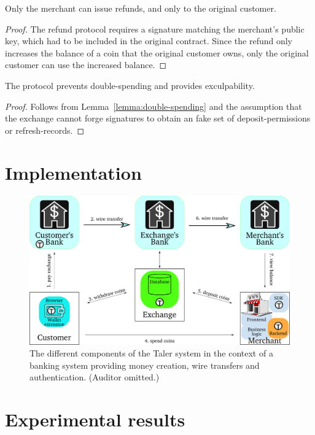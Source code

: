 \documentclass[sigconf, authordraft]{acmart}
\begin{document}
\begin{lemma}
Only the merchant can issue refunds, and only to the original customer.
\end{lemma}

\begin{proof}
The refund protocol requires a signature matching the merchant's public
key, which had to be included in the original contract.
Since the refund only increases the balance of a coin that the original
customer owns, only the original customer can use the increased balance.
\end{proof}


\begin{theorem}
  The protocol prevents double-spending and provides exculpability.
\end{theorem}
\begin{proof}
  Follows from Lemma~\ref{lemma:double-spending} and the assumption
  that the exchange cannot forge signatures to obtain an fake
  set of deposit-permissions or refresh-records.
\end{proof}



\section{Implementation}

\begin{figure}
  \includegraphics[width=\columnwidth]{taler-arch-full.pdf}
  \caption{The different components of the Taler system in the
    context of a banking system providing money creation,
    wire transfers and authentication. (Auditor omitted.)}
\end{figure}


\section{Experimental results}
\end{document}
